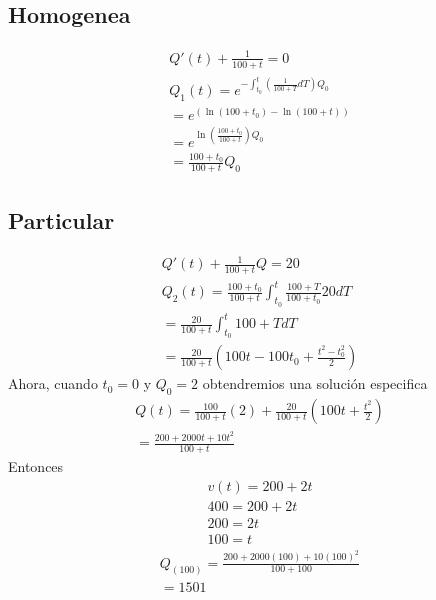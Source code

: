 \documentclass{article}
\numberwithin{equation}{section}
\theoremstyle{plain}  %
\begin{document}
\subsection{Homogenea}
\begin{equation*}
    \begin{split}
        Q'(t) + \frac{1}{100+t} = 0\\
        Q_{1} (t)=e^{-\int_{t_{0}}^{t}(\frac{1}{100+T}dT)Q_{0}} \\
        = e^{(\ln{(100+t_{0})}-\ln{(100+t)})} \\
        = e^{\ln{(\frac{100+t_{0}}{100+t})}Q_{0}} \\
        = \frac{100+t_{0}}{100+t}Q_{0}
    \end{split}
    \end{equation*}
\subsection{Particular}
\begin{equation*}
    \begin{split}
        Q'(t)+\frac{1}{100+t}Q=20 \\
        Q_{2}(t)= \frac{100+t_{0}}{100+t}\int_{t_{0}}^{t}\frac{100+T}{100+t_{0}}20dT \\ 
        = \frac{20}{100+t}\int_{t_{0}}^{t}100+TdT \\ 
        = \frac{20}{100+t}(100t-100t_{0}+\frac{t^{2}-t_{0}^{2}}{2})
    \end{split}
\end{equation*}
Ahora, cuando $t_{0}=0$ y $Q_{0}=2$
obtendremios una solución especifica
\begin{equation*}
    \begin{split}
        Q(t) = \frac{100}{100+t}(2) + \frac{20}{100+t}(100t+\frac{t^{2}}{2})\\
        = \frac{200+2000t+10t^{2}}{100+t}
    \end{split}
\end{equation*}
Entonces \\
\begin{equation*}
    \begin{split}
        v (t) = 200 + 2t \\
        400 = 200 + 2t \\
        200 = 2t \\
        100 = t
    \end{split}
\end{equation*}
\begin{equation*}
    \begin{split}
        Q_{(100)}=\frac{200+2000(100)+10(100)^{2}}{100+100} \\
        =1501
    \end{split}
\end{equation*}
\end{document}
